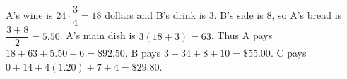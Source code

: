 A's wine is $24\cdot\dfrac{3}{4}=18$ dollars and B's drink is $3$. B's side is $8$, so A's bread is $\dfrac{3+8}{2}=5.50$. A's main dish is $3(18+3)=63$. Thus A pays $18+63+5.50+6=\boxed{\$92.50}$. B pays $3+34+8+10=\boxed{\$55.00}$. C pays $0+14+4(1.20)+7+4=\boxed{\$29.80}$.
